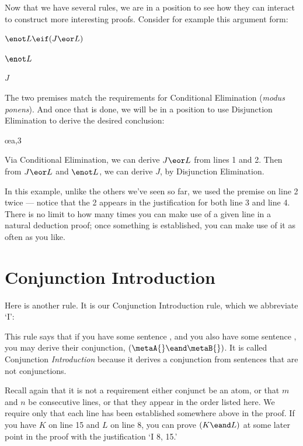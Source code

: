 Now that we have several rules, we are in a position to see how they can interact to construct more interesting proofs. Consider for example this argument form:

\begin{earg}
\item[] $\enot L \eif (J \eor L)$
\item[] $\enot L$
\item[\therefore] $J$
\end{earg}

The two premises match the requirements for Conditional Elimination (\emph{modus ponens}). And once that is done, we will be in a position to use Disjunction Elimination to derive the desired conclusion:

\begin{ndproof}
	  
	 
	 \oe{a,3}
\end{ndproof}

Via Conditional Elimination, we can derive $J \eor L$ from lines 1 and 2. Then from $J \eor L$ and $\enot L$, we can derive $J$, by Disjunction Elimination.

In this example, unlike the others we've seen so far, we used the premise on line 2 twice --- notice that the 2 appears in the justification for both line 3 and line 4. There is no limit to how many times you can make use of a given line in a natural deduction proof; once something is established, you can make use of it as often as you like.

\section{Conjunction Introduction}

Here is another rule. It is our Conjunction Introduction rule, which we abbreviate `{\eand}I':

\begin{ndproof}
	\metaA{}
	\metaB{}
	 
\end{ndproof}

This rule says that if you have some sentence \metaA{}, and you also have some sentence \metaB{}, you may derive their conjunction, $(\metaA{} \eand \metaB{})$. It is called Conjunction \emph{Introduction} because it derives a conjunction from sentences that are not conjunctions.

Recall again that it is not a requirement either conjunct be an atom, or that $m$ and $n$ be consecutive lines, or that they appear in the order listed here. We require only that each line has been established somewhere above in the proof. If you have $K$ on line 15 and $L$ on line 8, you can prove $(K\eand L)$ at some later point in the proof with the justification `{\eand}I 8, 15.'

